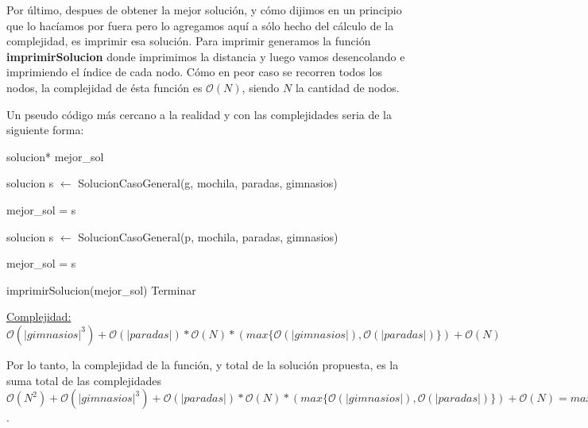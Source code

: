 Por último, despues de obtener la mejor solución, y cómo dijimos en un principio que lo hacíamos por fuera pero lo agregamos aquí a sólo hecho del cálculo de la complejidad, es imprimir esa solución. Para imprimir generamos la función \textbf{imprimirSolucion} donde imprimimos la distancia y luego vamos desencolando e imprimiendo el índice de cada nodo. Cómo en peor caso se recorren todos los nodos, la complejidad de ésta función es $\mathcal{O}(N)$, siendo $N$ la cantidad de nodos.

Un pseudo código más cercano a la realidad y con las complejidades seria de la siguiente forma:

\begin{algorithm}[H]
\label{}
\begin{algorithmic}[]

\State solucion* mejor\_sol 

 

	 

		\State solucion s $\leftarrow$ SolucionCasoGeneral(g, mochila, paradas, gimnasios) 

		 
			\State mejor\_sol = s 
		\EndIf
	
	\EndFor

\Else

	 

		\State solucion s $\leftarrow$ SolucionCasoGeneral(p, mochila, paradas, gimnasios) 

		 
			\State mejor\_sol = s 
		\EndIf

	\EndFor


\EndIf

\State imprimirSolucion(mejor\_sol) 
\State Terminar

\medskip
\Statex \underline{Complejidad: $\mathcal{O}(|gimnasios|^3) + \mathcal{O}(|paradas|) * \mathcal{O}(N) * (max\{\mathcal{O}(|gimnasios|), \mathcal{O}(|paradas|)\}) + \mathcal{O}(N)$}
\end{algorithmic}
\end{algorithm}

Por lo tanto, la complejidad de la función, y total de la solución propuesta, es la suma total de las complejidades $\mathcal{O}(N^2) + \mathcal{O}(|gimnasios|^3) + \mathcal{O}(|paradas|) * \mathcal{O}(N) * (max\{\mathcal{O}(|gimnasios|), \mathcal{O}(|paradas|)\}) + \mathcal{O}(N) = max\{\mathcal{O}(N^2), \mathcal{O}(|gimnasios|^3), \mathcal{O}(|paradas|) * \mathcal{O}(N) * (max\{\mathcal{O}(|gimnasios|), \mathcal{O}(|paradas|)\})\}$.




